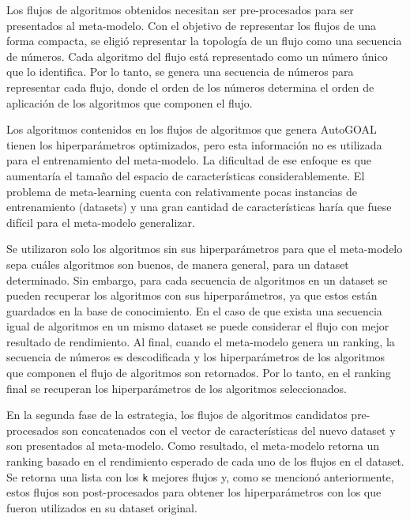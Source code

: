 Los flujos de algoritmos obtenidos necesitan ser pre-procesados para ser presentados al meta-modelo. Con el objetivo de representar los flujos de una forma compacta, se eligió representar la topología de un flujo como una secuencia de números. Cada algoritmo del flujo está representado como un número único que lo identifica. Por lo tanto, se genera una secuencia de números para representar cada flujo, donde el orden de los números determina el orden de aplicación de los algoritmos que componen el flujo.

Los algoritmos contenidos en los flujos de algoritmos que genera AutoGOAL tienen los hiperparámetros optimizados, pero esta información no es utilizada para el entrenamiento del meta-modelo. La dificultad de ese enfoque es que aumentaría el tamaño del espacio de características considerablemente. El problema de meta-learning cuenta con relativamente pocas instancias de entrenamiento (datasets) y una gran cantidad de características haría que fuese difícil para el meta-modelo generalizar.

Se utilizaron solo los algoritmos sin sus hiperparámetros para que el meta-modelo sepa cuáles algoritmos son buenos, de manera general, para un dataset determinado. Sin embargo, para cada secuencia de algoritmos en un dataset se pueden recuperar los algoritmos con sus hiperparámetros, ya que estos están guardados en la base de conocimiento. En el caso de que exista una secuencia igual de algoritmos en un mismo dataset se puede considerar el flujo con mejor resultado de rendimiento. Al final, cuando el meta-modelo genera un ranking, la secuencia de números es descodificada y los hiperparámetros de los algoritmos que componen el flujo de algoritmos son retornados. Por lo tanto, en el ranking final se recuperan los hiperparámetros de los algoritmos seleccionados.

En la segunda fase de la estrategia, los flujos de algoritmos candidatos pre-procesados son concatenados con el vector de características del nuevo dataset y son presentados al meta-modelo. Como resultado, el meta-modelo retorna un ranking basado en el rendimiento esperado de cada uno de los flujos en el dataset. Se retorna una lista con los \texttt{k} mejores flujos y, como se mencionó anteriormente, estos flujos son post-procesados para obtener los hiperparámetros con los que fueron utilizados en su dataset original.


